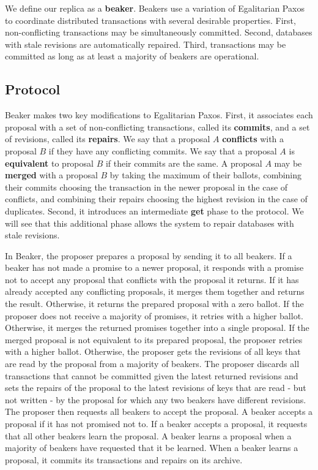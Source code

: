 \documentclass{article}
\begin{document}
    We define our replica as a \textbf{beaker}. Beakers use a variation of Egalitarian Paxos to
    coordinate distributed transactions with several desirable properties. First, non-conflicting
    transactions may be simultaneously committed. Second, databases with stale revisions are
    automatically repaired. Third, transactions may be committed as long as at least a majority of
    beakers are operational.

    \subsection{Protocol}
    Beaker makes two key modifications to Egalitarian Paxos. First, it associates each proposal with
    a set of non-conflicting transactions, called its \textbf{commits}, and a set of revisions,
    called its \textbf{repairs}. We say that a proposal $A$ \textbf{conflicts} with a proposal $B$ if
    they have any conflicting commits. We say that a proposal $A$ is \textbf{equivalent} to proposal
    $B$ if their commits are the same. A proposal $A$ may be \textbf{merged} with a proposal $B$ by
    taking the maximum of their ballots, combining their commits choosing the transaction in the
    newer proposal in the case of conflicts, and combining their repairs choosing the highest
    revision in the case of duplicates. Second, it introduces an intermediate \textbf{get} phase to
    the protocol. We will see that this additional phase allows the system to repair databases with
    stale revisions.

    In Beaker, the proposer prepares a proposal by sending it to all beakers. If a beaker has not
    made a promise to a newer proposal, it responds with a promise not to accept any proposal that
    conflicts with the proposal it returns. If it has already accepted any conflicting proposals, it
    merges them together and returns the result. Otherwise, it returns the prepared proposal with a
    zero ballot. If the proposer does not receive a majority of promises, it retries with a higher
    ballot. Otherwise, it merges the returned promises together into a single proposal. If the
    merged proposal is not equivalent to its prepared proposal, the proposer retries with a higher
    ballot. Otherwise, the proposer gets the revisions of all keys that are read by the proposal
    from a majority of beakers. The proposer discards all transactions that cannot be committed
    given the latest returned revisions and sets the repairs of the proposal to the latest revisions
    of keys that are read - but not written - by the proposal for which any two beakers have
    different revisions. The proposer then requests all beakers to accept the proposal. A
    beaker accepts a proposal if it has not promised not to. If a beaker accepts a proposal, it
    requests that all other beakers learn the proposal. A beaker learns a proposal when a majority
    of beakers have requested that it be learned. When a beaker learns a proposal, it commits its
    transactions and repairs on its archive.
\end{document}
